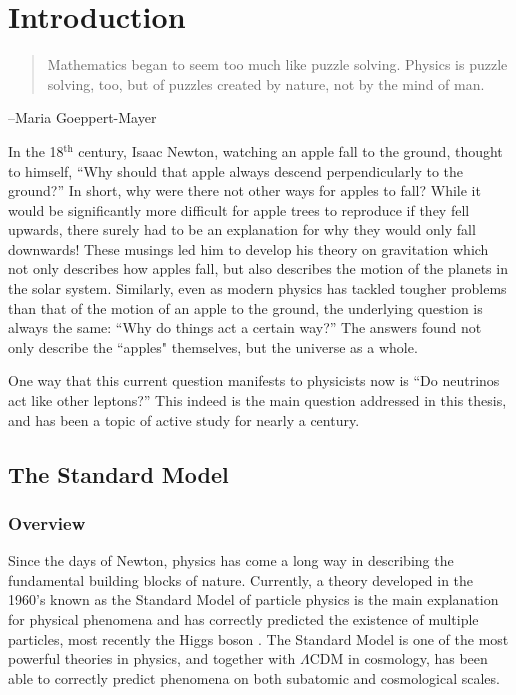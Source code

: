 \chapter{Introduction}
\begin{quote}
Mathematics began to seem too much like puzzle solving. Physics is puzzle solving, too, but of puzzles created by nature, not by the mind of man.
\end{quote}
\begin{flushright}
--Maria Goeppert-Mayer
\end{flushright}

In the 18$^\textrm{th}$ century, Isaac Newton,  watching an apple fall to the ground, thought to himself, ``Why should that apple always descend perpendicularly to the ground?''
In short, why were there not other ways for apples to fall? While it would be significantly more difficult for apple trees to reproduce if they fell upwards, there surely had to be an explanation for why they would only fall downwards!
These musings led him to develop his theory on gravitation which not only describes how apples fall, but also describes the motion of the planets in the solar system.
Similarly, even as modern physics has tackled tougher problems than that of the motion of an apple to the ground, the underlying question is always the same: ``Why do things act a certain way?''
The answers found not only describe the ``apples" themselves, but the universe as a whole.

One way that this current question manifests to physicists now is ``Do neutrinos act like other leptons?''
This indeed is the main question addressed in this thesis, and has been a topic of active study for nearly a century.

\section{The Standard Model}
\subsection{Overview}
Since the days of Newton, physics has come a long way in describing the fundamental building blocks of nature.
Currently, a theory developed in the 1960's known as the Standard Model of particle physics is the main explanation for physical phenomena and has correctly predicted the existence of multiple particles, most recently the Higgs boson \cite{Aad:2012tfa, Chatrchyan:2012xdj}.
The Standard Model is one of the most powerful theories in physics, and together with $\Lambda$CDM in cosmology, has been able to correctly predict phenomena on both subatomic and cosmological scales.


